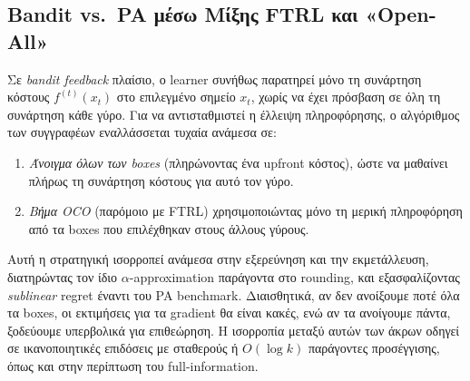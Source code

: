 \documentclass[11pt,a4paper]{article}
\begin{document}
\subsection*{Bandit vs.\ PA μέσω Μίξης FTRL και «Open-All»}
Σε \emph{bandit feedback} πλαίσιο, ο learner συνήθως παρατηρεί μόνο τη συνάρτηση κόστους \( f^{(t)}(x_t) \) στο επιλεγμένο σημείο \( x_t \), χωρίς να έχει πρόσβαση σε όλη τη συνάρτηση κάθε γύρο. Για να αντισταθμιστεί η έλλειψη πληροφόρησης, ο αλγόριθμος των συγγραφέων εναλλάσσεται τυχαία ανάμεσα σε:
\begin{enumerate}
  \item \emph{Άνοιγμα όλων των boxes} (πληρώνοντας ένα upfront κόστος), ώστε να μαθαίνει πλήρως τη συνάρτηση κόστους για αυτό τον γύρο.
  \item \emph{Βήμα OCO} (παρόμοιο με FTRL) χρησιμοποιώντας μόνο τη μερική πληροφόρηση από τα boxes που επιλέχθηκαν στους άλλους γύρους.
\end{enumerate}
Αυτή η στρατηγική ισορροπεί ανάμεσα στην εξερεύνηση και την εκμετάλλευση, διατηρώντας τον ίδιο \(\alpha\)-approximation παράγοντα στο rounding, και εξασφαλίζοντας \emph{sublinear} regret έναντι του PA benchmark. Διαισθητικά, αν δεν ανοίξουμε ποτέ όλα τα boxes, οι εκτιμήσεις για τα gradient θα είναι κακές, ενώ αν τα ανοίγουμε πάντα, ξοδεύουμε υπερβολικά για επιθεώρηση. Η ισορροπία μεταξύ αυτών των άκρων οδηγεί σε ικανοποιητικές επιδόσεις με σταθερούς ή \(O(\log k)\) παράγοντες προσέγγισης, όπως και στην περίπτωση του full-information.
\end{document}
